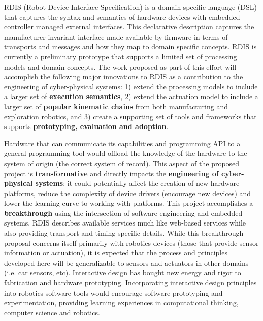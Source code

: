 RDIS (Robot Device Interface Specification) \cite{Anderson2012} is a domain-specific language (DSL) that captures the syntax and semantics of hardware devices with embedded controller managed external interfaces.  This declarative description captures the manufacturer invariant interface made available by firmware in terms of transports and messages and how they map to domain specific concepts.  RDIS is currently a preliminary prototype that supports a limited set of processing models and domain concepts.  The work proposed as part of this effort will accomplish the following major innovations to RDIS as a contribution to the engineering of cyber-physical systems: 1) extend the processing models to include a larger set of {\bf execution semantics}, 2) extend the actuation model to include a larger set of {\bf popular kinematic chains} from both manufacturing and exploration robotics, and 3) create a supporting set of tools and frameworks that supports {\bf prototyping, evaluation and adoption}.

Hardware that can communicate its capabilities and programming API to a general programming tool would offload the knowledge of the hardware to the system of origin (the correct system of record).  This aspect of the proposed project is {\bf transformative} and directly impacts the {\bf engineering of cyber-physical systems}; it could potentially affect the creation of new hardware platforms, reduce the complexity of device drivers (encourage new devices) and lower the learning curve to working with platforms.  This project accomplishes a {\bf breakthrough} using the intersection of software engineering and embedded systems.  RDIS describes available services much like web-based services while also providing transport and timing specific details.  While this breakthrough proposal concerns itself primarily with robotics devices (those that provide sensor information or actuation), it is expected that the process and principles developed here will be generalizable to sensors and actuators in other domains (i.e. car sensors, etc).  Interactive design has bought new energy and rigor to fabrication and hardware prototyping.  Incorporating interactive design principles into robotics software tools would encourage software prototyping and experimentation, providing learning experiences in computational thinking, computer science and robotics.  



